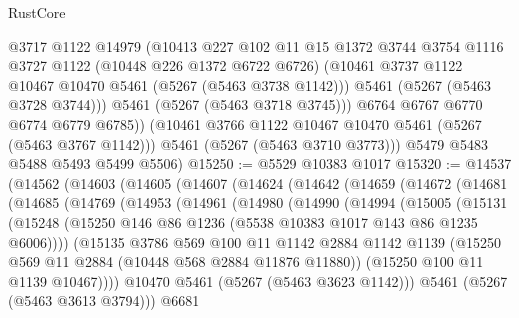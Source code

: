 \begin{lexlean}{RustCore}
\begin{coremodule}
              @3717
              @1122
              @14979
              (@10413
                @227
                @102
                @11
                @15
                @1372
                @3744
                @3754
                @1116
                @3727
                @1122
                (@10448 @226 @1372 @6722 @6726)
                (@10461 @3737 @1122 @10467 @10470 @5461 (@5267 (@5463 @3738 @1142)))
                @5461
                (@5267 (@5463 @3728 @3744)))
              @5461
              (@5267 (@5463 @3718 @3745)))
            @6764
            @6767
            @6770
            @6774
            @6779
            @6785))
        (@10461 @3766 @1122 @10467 @10470 @5461 (@5267 (@5463 @3767 @1142)))
        @5461
        (@5267 (@5463 @3710 @3773)))
      @5479
      @5483
      @5488
      @5493
      @5499
      @5506)
@15250 := @5529 @10383 @1017
@15320 := @14537
    (@14562
      (@14603
        (@14605
          (@14607
            (@14624
              (@14642
                (@14659
                  (@14672
                    (@14681
                      (@14685
                        (@14769
                          (@14953
                            (@14961
                              (@14980
                                (@14990
                                  (@14994
                                    (@15005
                                      (@15131
                                        (@15248
                                          (@15250
                                            @146
                                            @86
                                            @1236
                                            (@5538 @10383 @1017 @143 @86 @1235 @6006))))
                                      (@15135
                                        @3786
                                        @569
                                        @100
                                        @11
                                        @1142
                                        @2884
                                        @1142
                                        @1139
                                        (@15250 @569 @11 @2884 (@10448 @568 @2884 @11876 @11880))
                                        (@15250 @100 @11 @1139 @10467))))
                                  @10470
                                  @5461
                                  (@5267 (@5463 @3623 @1142)))
                                @5461
                                (@5267 (@5463 @3613 @3794)))
                              @6681

\end{coremodule}
\end{lexlean}
